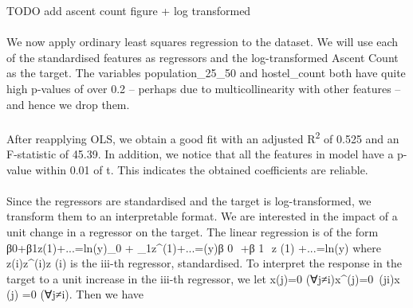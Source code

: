 \documentclass[11pt,a4paper]{article}
\begin{document}
TODO add ascent count figure + log transformed \\  \\
We now apply ordinary least squares regression to the dataset. We will use each of the standardised features as regressors and the log-transformed Ascent Count as the target. The variables population\_25\_50 and hostel\_count both have quite high p-values of over 0.2 – perhaps due to multicollinearity with other features – and hence we drop them. \\  \\
After reapplying OLS, we obtain a good fit with an adjusted R\textsuperscript{2} of 0.525 and an F-statistic of 45.39. In addition, we notice that all the features in model have a p-value within 0.01 of t. This indicates the obtained coefficients are reliable. \\  \\
Since the regressors are standardised and the target is log-transformed, we transform them to an interpretable format. We are interested in the impact of a unit change in a regressor on the target. The linear regression is of the form β0+β1z(1)+...=ln⁡(y)\beta_0 + \beta_1z^{(1)}+...=\ln(y)β 
0
​	 +β 
1
​	 z 
(1)
 +...=ln(y) where z(i)z^{(i)}z 
(i)
  is the iii-th regressor, standardised. To interpret the response in the target to a unit increase in the iii-th regressor, we let x(j)=0 (∀j≠i)x^{(j)}=0\ (\forall j\neq i)x 
(j)
 =0 (∀j≠i). Then we have
\end{document}
